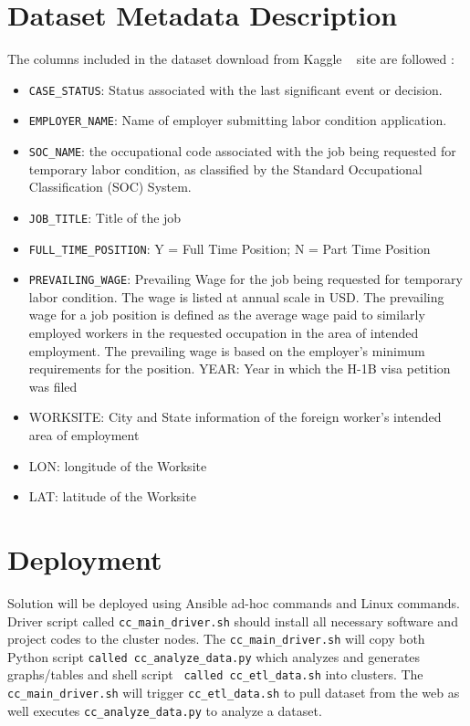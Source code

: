 \documentclass[9pt,twocolumn,twoside]{../../styles/osajnl}
\begin{document}
\section{Dataset Metadata Description}

The columns included in the dataset download from Kaggle ~\cite{www-kaggle} site  are followed  : 

\begin{itemize}
 \item  \verb|CASE_STATUS|: Status associated with the last significant event or decision.
 \item \verb|EMPLOYER_NAME|: Name of employer submitting labor condition application.
 \item  \verb|SOC_NAME|: the occupational code associated with the job being requested for temporary labor condition, as classified by the Standard Occupational Classification (SOC) System.
 \item  \verb|JOB_TITLE|: Title of the job
 \item  \verb|FULL_TIME_POSITION|: Y = Full Time Position; N = Part Time Position
 \item  \verb|PREVAILING_WAGE|: Prevailing Wage for the job being requested for temporary labor condition. The wage is listed at annual scale in USD. The prevailing wage for a job position is defined as the average wage paid to similarly employed workers in the requested occupation in the area of intended employment. The prevailing wage is based on the employer’s minimum requirements for the position. 
 YEAR: Year in which the H-1B visa petition was filed
 \item  WORKSITE: City and State information of the foreign worker's intended area of employment
 \item  LON: longitude of the Worksite
 \item  LAT: latitude of the Worksite
\end{itemize}

\section{Deployment}
Solution will be deployed using Ansible \cite{wiki-ansible} ad-hoc commands and Linux commands. Driver script called \verb|cc_main_driver.sh|  should install all necessary software and project codes to the cluster nodes.  The \verb|cc_main_driver.sh|  will copy both Python script \verb|called cc_analyze_data.py| which analyzes and generates graphs/tables and shell script \verb| called cc_etl_data.sh| into clusters. The \verb|cc_main_driver.sh|  will trigger \verb|cc_etl_data.sh| to pull dataset from the web as well executes \verb|cc_analyze_data.py| to analyze a dataset. 
\end{document}
